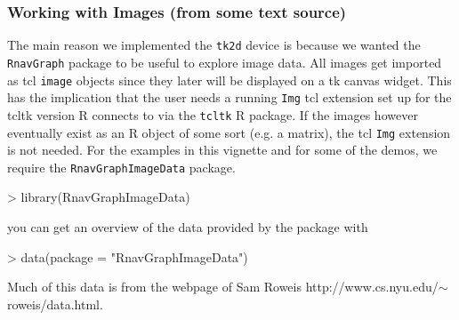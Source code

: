 \documentclass[12pt,oneside,titlepage,letter]{article}
\newcommand{\modify}[1]{{\color{blue}#1}}
\begin{document}
\subsubsection{Working with Images (from some text source)}
The main reason we implemented the \texttt{tk2d} device is because we wanted the \texttt{RnavGraph} package to be useful to explore image data. All images get imported as tcl \texttt{image} objects since they later will be displayed on a tk canvas widget. This has the implication that the user needs a running \texttt{Img} tcl extension set up for the tcltk version R connects to via the \texttt{tcltk} R package. If the images however eventually exist as an R object of some sort (e.g. a matrix), the tcl \texttt{Img} extension is not needed. For the examples in this vignette and for some of the demos, we require the \texttt{RnavGraphImageData} package. 
\begin{Schunk}
\begin{Sinput}
> library(RnavGraphImageData)
\end{Sinput}
\end{Schunk}
you can get an overview of the data provided by the package with
\begin{Schunk}
\begin{Sinput}
> data(package = "RnavGraphImageData")
\end{Sinput}
\end{Schunk}
\modify{Much of this data is from the webpage of Sam Roweis \tiny{http://www.cs.nyu.edu/$\sim$roweis/data.html}}.\\
\end{document}
